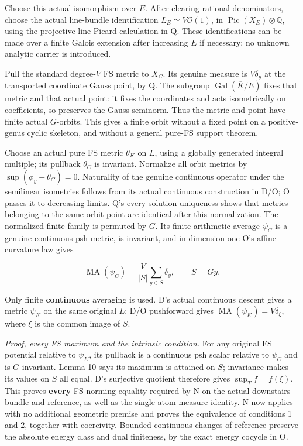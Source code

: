 \documentclass[
  11pt,
]{article}
\begin{document}
Choose this actual isomorphism over \(E\). After clearing rational
denominators, choose the actual line-bundle identification
\(L_E\simeq V\mathcal O(1)\), in
\(\operatorname{Pic}(X_E)\otimes\mathbb Q\), using the projective-line
Picard calculation in Q. These identifications can be made over a finite
Galois extension after increasing \(E\) if necessary; no unknown
analytic carrier is introduced.

Pull the standard degree-\(V\) FS metric to \(X_C\). Its genuine measure
is \(V\delta_y\) at the transported coordinate Gauss point, by Q. The
subgroup \(\operatorname{Gal}(\overline K/E)\) fixes that metric and
that actual point: it fixes the coordinates and acts isometrically on
coefficients, so preserves the Gauss seminorm. Thus the metric and point
have finite actual \(G\)-orbits. This gives a finite orbit without a
fixed point on a positive-genus cyclic skeleton, and without a general
pure-FS support theorem.

Choose an actual pure FS metric \(\theta_K\) on \(L\), using a globally
generated integral multiple; its pullback \(\theta_C\) is invariant.
Normalize all orbit metrics by \(\sup(\phi_y-\theta_C)=0\). Naturality
of the genuine continuous operator under the semilinear isometries
follows from its actual continuous construction in D/O; O passes it to
decreasing limits. Q's every-solution uniqueness shows that metrics
belonging to the same orbit point are identical after this
normalization. The normalized finite family is permuted by \(G\). Its
finite arithmetic average \(\psi_C\) is a genuine continuous psh metric,
is invariant, and in dimension one O's affine curvature law gives

\[
 \operatorname{MA}(\psi_C)=
      \frac V{|S|}\sum_{y\in S}\delta_y,
 \qquad S=G y.
\]

Only finite \textbf{continuous} averaging is used. D's actual continuous
descent gives a metric \(\psi_K\) on the same original \(L\); D/O
pushforward gives \(\operatorname{MA}(\psi_K)=V\delta_\xi\), where
\(\xi\) is the common image of \(S\).

\emph{Proof, every FS maximum and the intrinsic condition.} For any
original FS potential relative to \(\psi_K\), its pullback is a
continuous psh scalar relative to \(\psi_C\) and is \(G\)-invariant.
Lemma 10 says its maximum is attained on \(S\); invariance makes its
values on \(S\) all equal. D's surjective quotient therefore gives
\(\sup_T f=f(\xi)\). This proves \textbf{every} FS norming equality
required by N on the actual downstairs bundle and reference, as well as
the single-atom measure identity. N now applies with no additional
geometric premise and proves the equivalence of conditions 1 and 2,
together with coercivity. Bounded continuous changes of reference
preserve the absolute energy class and dual finiteness, by the exact
energy cocycle in O.
\end{document}
